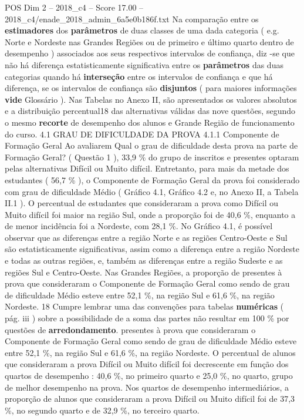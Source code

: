 \begin{textsample}{POS Dim 2 – 2018\_c4 – Score 17.00 – 2018\_c4/enade\_2018\_admin\_6a5e0b186f.txt}
Na comparação entre os \textbf{estimadores} dos \textbf{parâmetros} de duas classes de uma dada categoria ( e.g.
Norte e Nordeste nas Grandes Regiões ou de primeiro e último quarto dentro de desempenho ) associados aos seus respectivos intervalos de confiança, diz -se que não há diferença estatisticamente significativa entre os \textbf{parâmetros} das duas categorias quando há \textbf{interseção} entre os intervalos de confiança e que há diferença, se os intervalos de confiança são \textbf{disjuntos} ( para maiores informações \textbf{vide} Glossário ).
Nas Tabelas no Anexo II, são apresentados os valores absolutos e a distribuição percentual18 das alternativas válidas das nove questões, segundo o mesmo \textbf{recorte} de desempenho dos alunos e Grande Região de funcionamento do curso. 4.1 GRAU DE DIFICULDADE DA PROVA 4.1.1 Componente de Formação Geral Ao avaliarem Qual o grau de dificuldade desta prova na parte de Formação Geral? ( Questão 1 ), 33,9 \% do grupo de inscritos e presentes optaram pelas alternativas Difícil ou Muito difícil.
Entretanto, para mais da metade dos estudantes ( 56,7 \% ), o Componente de Formação Geral da prova foi considerado com grau de dificuldade Médio ( Gráfico 4.1, Gráfico 4.2 e, no Anexo II, a Tabela II.1 ).
O percentual de estudantes que consideraram a prova como Difícil ou Muito difícil foi maior na região Sul, onde a proporção foi de 40,6 \%, enquanto a de menor incidência foi a Nordeste, com 28,1 \%.
No Gráfico 4.1, é possível observar que as diferenças entre a região Norte e as regiões Centro-Oeste e Sul são estatisticamente significativas, assim como a diferença entre a região Nordeste e todas as outras regiões, e, também as diferenças entre a região Sudeste e as regiões Sul e Centro-Oeste.
Nas Grandes Regiões, a proporção de presentes à prova que consideraram o Componente de Formação Geral como sendo de grau de dificuldade Médio esteve entre 52,1 \%, na região Sul e 61,6 \%, na região Nordeste. 18 Cumpre lembrar uma das convenções para tabelas \textbf{numéricas} ( pág. iii ) sobre a possibilidade de a soma das partes não resultar em 100 \% por questões de \textbf{arredondamento}. presentes à prova que consideraram o Componente de Formação Geral como sendo de grau de dificuldade Médio esteve entre 52,1 \%, na região Sul e 61,6 \%, na região Nordeste.
O percentual de alunos que consideraram a prova Difícil ou Muito difícil foi decrescente em função dos quartos de desempenho : 40,6 \%, no primeiro quarto e 25,0 \%, no quarto, grupo de melhor desempenho na prova.
Nos quartos de desempenho intermediários, a proporção de alunos que consideraram a prova Difícil ou Muito difícil foi de 37,3 \%, no segundo quarto e de 32,9 \%, no terceiro quarto.

\end{textsample}
